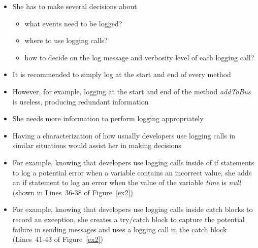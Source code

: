 \documentclass{article}
\newcommand{\vars}{\textit}
\begin{document}
\begin{itemize} [leftmargin=.1in]
\begin{figure}[H]
\begin{lstlisting}
  public static void addToBus(  EBComponent comp){
    synchronized (components) {
      components.add(comp);
      copyComponents=null;
    }
  }
  public static void removeFromBus(  EBComponent comp){
    synchronized (components) {
      components.remove(comp);
      copyComponents=null;
    }
  }
  public static EBComponent[] getComponents(){
    synchronized (components) {
      if (copyComponents == null) {
        copyComponents=(EBComponent[])components.toArray(new EBComponent[components.size()]);
      }
      return copyComponents;
    }
  }
  public static void send(  EBMessage message){
    EBComponent[] comps=getComponents();
    for (int i=0; i < comps.length; i++) {
        EBComponent comp=comps[i];
        if (Debug.EB_TIMER) {
          long start=System.currentTimeMillis();
          comp.handleMessage(message);
          long time=(System.currentTimeMillis() - start);
        }
        else  comps[i].handleMessage(message);
    }
  }
}
\end{lstlisting}
\caption{A Java class without the usage of logging\label{ex1}}
\end{figure}

\item She has to make several decisions about
\begin{itemize}
\item what events need to be logged?
\item where to use logging calls?
\item how to decide on the log message and verbosity level of each logging call?
\end{itemize}
\item It is recommended to simply log at the start and end of every method
\item However, for example, logging at the start and end of the method \vars{addToBus} is useless, producing redundant information
\item She needs more information to perform logging appropriately
\item Having a characterization  of how usually developers use logging calls in similar situations would assist her in making decisions
\item For example, knowing that developers use logging calls inside of if statements to log a potential error when a variable contains an incorrect value, she adds an if statement to log an error when the value of the variable \vars{time} is \vars{null} (shown in Lines~36-38 of Figure~\ref{ex2})
\item For example, knowing that developers use logging calls inside catch blocks to record an exception, she creates a try/catch block to capture the potential failure in sending messages and uses a logging call in the catch block (Lines~41-43 of Figure~\ref{ex2})


\end{itemize}
\end{document}
